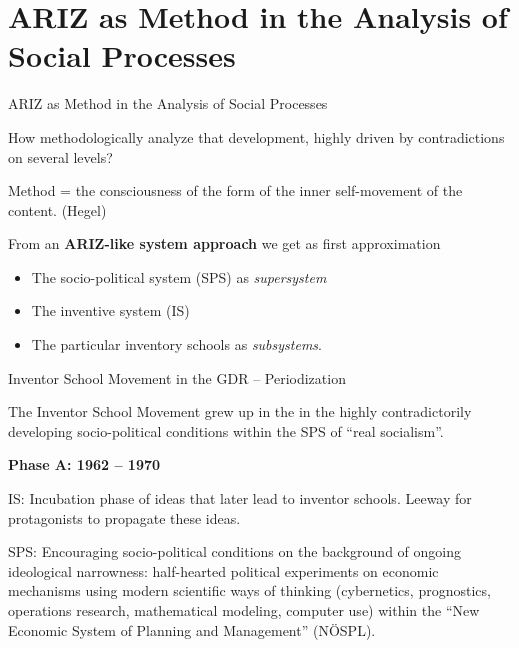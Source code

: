 \documentclass[11pt]{beamer}
\begin{document}
\section{ARIZ as Method in the Analysis of Social Processes}
\begin{frame}{ARIZ as Method in the Analysis of Social Processes}

  How methodologically analyze that development, highly driven by
  contradictions on several levels? \vfill

  Method = the consciousness of the form of the inner self-movement of the
  content. (Hegel) \vfill

  From an \textbf{ARIZ-like system approach} we get as first approximation
  \begin{itemize}
  \item The socio-political system (SPS) as \emph{supersystem}
  \item The inventive system (IS)
  \item The particular inventory schools as \emph{subsystems}.
  \end{itemize}
\end{frame}

\begin{frame}{Inventor School Movement in the GDR -- Periodization}

  The Inventor School Movement grew up in the in the highly contradictorily
  developing socio-political conditions within the SPS of ``real
  socialism''. \vfill

  \small
   
  \textbf{Phase A: 1962 -- 1970}

  IS: Incubation phase of ideas that later lead to inventor schools.  Leeway
  for protagonists to propagate these ideas.
   
  SPS: Encouraging socio-political conditions on the background of ongoing
  ideological narrowness: half-hearted political experiments on economic
  mechanisms using modern scientific ways of thinking (cybernetics,
  prognostics, operations research, mathematical modeling, computer use)
  within the ``New Economic System of Planning and Management'' (NÖSPL).
\end{frame}
\end{document}
